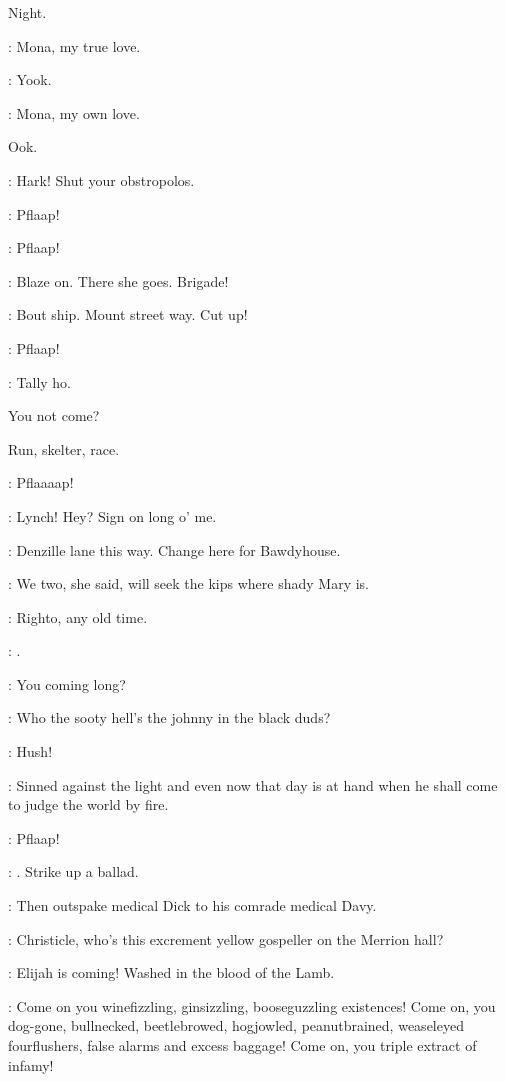 Night.

\crotthers:
Mona,
my true love.

\lynch:
Yook.

\crotthers:
Mona,
my own love.

Ook.


\lynch:
Hark!
Shut your obstropolos.

:
Pflaap!

:
Pflaap!

\lenehan:
Blaze on.
There she goes.
Brigade!

\punch:
Bout ship.
Mount street way.
Cut up!

:
Pflaap!

\lynch:
Tally ho.

You not come?

Run,
skelter,
race.

:
Pflaaaap!


\stephen:
Lynch!
Hey?
Sign on long o' me.

\lynch:
Denzille lane this way.
Change here for Bawdyhouse.

\stephen:
We two,
she said,
will seek the kips where shady Mary is.

\lynch:
Righto,
any old time.

\stephen:
.

\lynch:
You coming long?

\stephen:
Who the sooty hell's the johnny in the black duds?

\lynch:
Hush!

\dowie:
Sinned against the light and even now that day is at hand
when he shall come to judge the world by fire.

:
Pflaap!

\stephen:
.
Strike up a ballad.

:
Then outspake medical Dick to his comrade medical Davy.

\bystander:
Christicle,
who's this excrement yellow gospeller on the Merrion hall?

\dowie:
Elijah is coming!
Washed in the blood of the Lamb.

\dowie:
Come on you winefizzling,
ginsizzling,
booseguzzling existences!
Come on,
you dog-gone,
bullnecked,
beetlebrowed,
hogjowled,
peanutbrained,
weaseleyed fourflushers,
false alarms and excess baggage!
Come on,
you triple extract of infamy!


